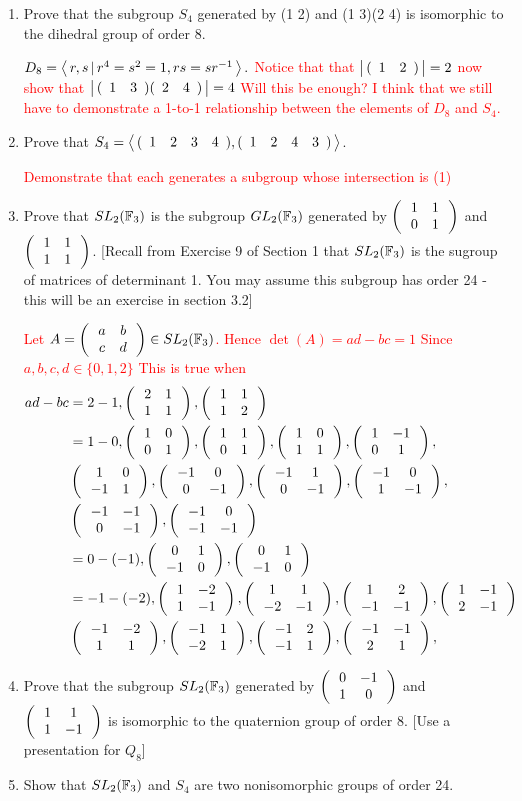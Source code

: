 \documentclass[10pt,a4paper]{report}
\newcommand{\RED}[1]{\textcolor{red}{#1}}
\begin{document}
\begin{enumerate}
\item Prove that the subgroup $S_4$ generated by (1 2) and (1 3)(2 4) is isomorphic to the dihedral group of order 8.

\RED{$	D_{8} = \ABRACKET{r,s\,|\,r^4=s^2=1,rs=sr^{-1}}.$
Notice that that $\BARS{\CYCLE{1&2}} = 2$  now show that $\BARS{\CYCLE{1&3}\CYCLE{2&4}}=4$ Will this be enough?  I think that we still have to demonstrate a 1-to-1 relationship between the elements of $D_8$ and $S_4$.
}

\item Prove that $S_4=\ABRACKET{\CYCLE{1&2&3&4},\CYCLE{1&2&4&3}}$.

\RED{Demonstrate that each generates a subgroup whose intersection is (1)}

\item Prove that $SL_2(\FF_3)$ is the subgroup $GL_2(\FF_3)$ generated by $\TWOXTWO{1}{1}{0}{1}$ and $\TWOXTWO{1}{1}{1}{1}$. [Recall from Exercise 9 of Section 1 that $SL_2(\FF_3)$ is the sugroup of matrices of determinant 1.  You may assume this subgroup has order 24 - this will be an exercise in section 3.2]

\RED{Let $A= \TWOXTWO{a}{b}{c}{d} \in SL_2(\FF_3)$.  Hence $\det(A) = ad-bc = 1$  Since $a,b,c,d \in \{0,1,2\}$  This is true when \begin{align*}
	ad-bc &= 2-1, \TWOXTWO{2}{1}{1}{1}, \TWOXTWO{1}{1}{1}{2}\\ 
	&= 1-0, \TWOXTWO{1}{0}{0}{1},\TWOXTWO{1}{1}{0}{1},\TWOXTWO{1}{0}{1}{1},\TWOXTWO{1}{-1}{0}{1},\\ &\TWOXTWO{1}{0}{-1}{1},\TWOXTWO{-1}{0}{0}{-1},\TWOXTWO{-1}{1}{0}{-1},\TWOXTWO{-1}{0}{1}{-1},\\
	&\TWOXTWO{-1}{-1}{0}{-1},\TWOXTWO{-1}{0}{-1}{-1}\\
	&= 0-(-1),\TWOXTWO{0}{1}{-1}{0},\TWOXTWO{0}{1}{-1}{0}\\
	&= -1-(-2),\TWOXTWO{1}{-2}{1}{-1}, \TWOXTWO{1}{1}{-2}{-1},\TWOXTWO{1}{2}{-1}{-1}, \TWOXTWO{1}{-1}{2}{-1}\\
	&\TWOXTWO{-1}{-2}{1}{1}, \TWOXTWO{-1}{1}{-2}{1},\TWOXTWO{-1}{2}{-1}{1}, \TWOXTWO{-1}{-1}{2}{1},
\end{align*}
}

\item Prove that the subgroup $SL_2(\FF_3)$ generated by $\TWOXTWO{0}{-1}{1}{0}$ and $\TWOXTWO{1}{1}{1}{-1}$ is isomorphic to the quaternion group of order 8. [Use a presentation for $Q_8$]

\item Show that $SL_2(\FF_3)$ and $S_4$ are two nonisomorphic groups of order 24.


\end{enumerate}
\end{document}
